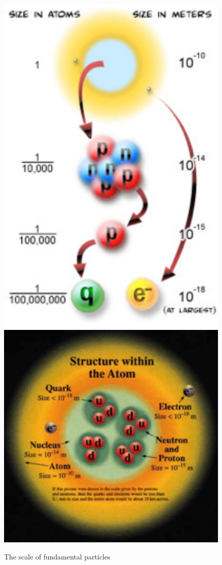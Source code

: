 \begin{figure}[h]
\centering\includegraphics[scale=0.5]{./ElementaryParticles/Pictures/fi1.pdf}
\centering\includegraphics[scale=0.5]{./ElementaryParticles/Pictures/fig2.pdf}
\caption{The scale of fundamental particles}
\label{fig:fig1}
\end{figure}


